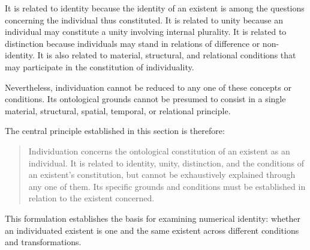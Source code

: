 It is related to identity because the identity of
an existent is among the questions concerning the
individual thus constituted. It is related to unity
because an individual may constitute a unity involving
internal plurality. It is related to distinction
because individuals may stand in relations of
difference or non-identity. It is also related to
material, structural, and relational conditions
that may participate in the constitution of
individuality.

Nevertheless, individuation cannot be reduced to
any one of these concepts or conditions. Its
ontological grounds cannot be presumed to consist
in a single material, structural, spatial, temporal,
or relational principle.

The central principle established in this section
is therefore:

\begin{quote}
Individuation concerns the ontological constitution
of an existent as an individual. It is related to
identity, unity, distinction, and the conditions
of an existent's constitution, but cannot be
exhaustively explained through any one of them.
Its specific grounds and conditions must be
established in relation to the existent concerned.
\end{quote}

This formulation establishes the basis for examining
numerical identity: whether an individuated existent
is one and the same existent across different
conditions and transformations.

